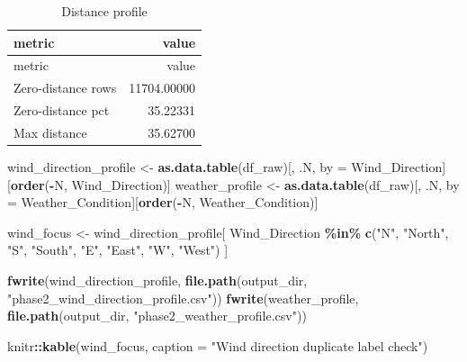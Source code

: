 \documentclass[
]{article}
\newenvironment{Shaded}{\begin{snugshade}}{\end{snugshade}}
\newcommand{\AttributeTok}[1]{\textcolor[rgb]{0.13,0.29,0.53}{#1}}
\newcommand{\FunctionTok}[1]{\textcolor[rgb]{0.13,0.29,0.53}{\textbf{#1}}}
\newcommand{\NormalTok}[1]{#1}
\newcommand{\OtherTok}[1]{\textcolor[rgb]{0.56,0.35,0.01}{#1}}
\newcommand{\SpecialCharTok}[1]{\textcolor[rgb]{0.81,0.36,0.00}{\textbf{#1}}}
\newcommand{\StringTok}[1]{\textcolor[rgb]{0.31,0.60,0.02}{#1}}
\begin{document}
\begin{longtable}[]{@{}lr@{}}
\caption{Distance profile}\tabularnewline
\toprule\noalign{}
metric & value \\
\midrule\noalign{}
\endfirsthead
\toprule\noalign{}
metric & value \\
\midrule\noalign{}
\endhead
\bottomrule\noalign{}
\endlastfoot
Zero-distance rows & 11704.00000 \\
Zero-distance pct & 35.22331 \\
Max distance & 35.62700 \\
\end{longtable}

\begin{Shaded}
\begin{Highlighting}[]
\NormalTok{wind\_direction\_profile }\OtherTok{\textless{}{-}} \FunctionTok{as.data.table}\NormalTok{(df\_raw)[, .N, by }\OtherTok{=}\NormalTok{ Wind\_Direction][}\FunctionTok{order}\NormalTok{(}\SpecialCharTok{{-}}\NormalTok{N, Wind\_Direction)]}
\NormalTok{weather\_profile }\OtherTok{\textless{}{-}} \FunctionTok{as.data.table}\NormalTok{(df\_raw)[, .N, by }\OtherTok{=}\NormalTok{ Weather\_Condition][}\FunctionTok{order}\NormalTok{(}\SpecialCharTok{{-}}\NormalTok{N, Weather\_Condition)]}

\NormalTok{wind\_focus }\OtherTok{\textless{}{-}}\NormalTok{ wind\_direction\_profile[}
\NormalTok{  Wind\_Direction }\SpecialCharTok{\%in\%} \FunctionTok{c}\NormalTok{(}\StringTok{"N"}\NormalTok{, }\StringTok{"North"}\NormalTok{, }\StringTok{"S"}\NormalTok{, }\StringTok{"South"}\NormalTok{, }\StringTok{"E"}\NormalTok{, }\StringTok{"East"}\NormalTok{, }\StringTok{"W"}\NormalTok{, }\StringTok{"West"}\NormalTok{)}
\NormalTok{]}

\FunctionTok{fwrite}\NormalTok{(wind\_direction\_profile, }\FunctionTok{file.path}\NormalTok{(output\_dir, }\StringTok{"phase2\_wind\_direction\_profile.csv"}\NormalTok{))}
\FunctionTok{fwrite}\NormalTok{(weather\_profile, }\FunctionTok{file.path}\NormalTok{(output\_dir, }\StringTok{"phase2\_weather\_profile.csv"}\NormalTok{))}

\NormalTok{knitr}\SpecialCharTok{::}\FunctionTok{kable}\NormalTok{(wind\_focus, }\AttributeTok{caption =} \StringTok{"Wind direction duplicate label check"}\NormalTok{)}
\end{Highlighting}
\end{Shaded}
\end{document}
